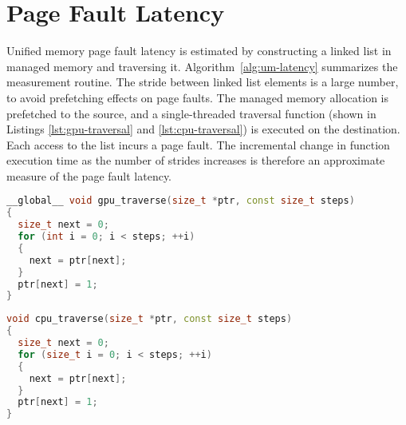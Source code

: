 \section{Page Fault Latency}

Unified memory page fault latency is estimated by constructing a linked list in managed memory and traversing it.
Algorithm~\ref{alg:um-latency} summarizes the measurement routine.
The stride between linked list elements is a large number, to avoid prefetching effects on page faults.
The managed memory allocation is prefetched to the source, and a single-threaded traversal function (shown in Listings \ref{lst:gpu-traversal} and \ref{lst:cpu-traversal}) is executed on the destination.
Each access to the list incurs a page fault.
The incremental change in function execution time as the number of strides increases is therefore an approximate measure of the page fault latency.


\begin{lstlisting}[language=c++, caption=GPU Linked List Traversal Kernel for Algorithm~\ref{alg:um-latency}, label=lst:gpu-traversal]
__global__ void gpu_traverse(size_t *ptr, const size_t steps)
{
  size_t next = 0;
  for (int i = 0; i < steps; ++i)
  {
    next = ptr[next];
  }
  ptr[next] = 1;
}
\end{lstlisting}

\begin{lstlisting}[language=c++, caption=CPU Linked List Traversal Function for Algorithm~\ref{alg:um-latency}, label=lst:cpu-traversal]
void cpu_traverse(size_t *ptr, const size_t steps)
{
  size_t next = 0;
  for (size_t i = 0; i < steps; ++i)
  {
    next = ptr[next];
  }
  ptr[next] = 1;
}
\end{lstlisting}

